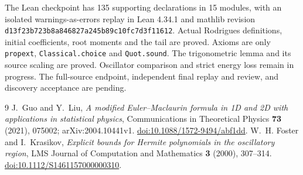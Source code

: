 \documentclass[11pt]{article}
\begin{document}
The Lean checkpoint has 135 supporting declarations in 15 modules, with an isolated warnings-as-errors replay in Lean 4.34.1 and mathlib revision\newline
\texttt{d13f23b723b8a846827a245b89c10fc7d3f11612}. Actual Rodrigues definitions, initial coefficients, root moments and the tail are proved. Axioms are only \texttt{propext}, \texttt{Classical.choice} and \texttt{Quot.sound}. The trigonometric lemma and its source scaling are proved. Oscillator comparison and strict energy loss remain in progress. The full-source endpoint, independent final replay and review, and discovery acceptance are pending.

\small
\begin{thebibliography}{9}
 J.~Guo and Y.~Liu, \emph{A modified Euler--Maclaurin formula in 1D and 2D with applications in statistical physics}, Communications in Theoretical Physics \textbf{73} (2021), 075002; arXiv:2004.10441v1. \href{https://doi.org/10.1088/1572-9494/abf1dd}{doi:10.1088/1572-9494/abf1dd}.
 W.~H. Foster and I.~Krasikov, \emph{Explicit bounds for Hermite polynomials in the oscillatory region}, LMS Journal of Computation and Mathematics \textbf{3} (2000), 307--314. \href{https://doi.org/10.1112/S1461157000000310}{doi:10.1112/S1461157000000310}.
\end{thebibliography}
\end{document}
